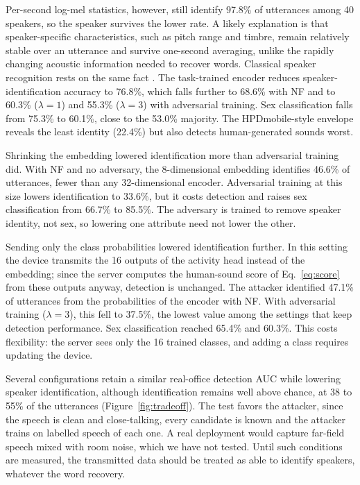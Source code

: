\documentclass[11pt]{article}
\begin{document}
Per-second log-mel statistics, however, still identify 97.8\% of utterances among 40 speakers, so the speaker survives the lower rate. A likely explanation is that speaker-specific characteristics, such as pitch range and timbre, remain relatively stable over an utterance and survive one-second averaging, unlike the rapidly changing acoustic information needed to recover words. Classical speaker recognition rests on the same fact \citep{reynolds2000gmm}. The task-trained encoder reduces speaker-identification accuracy to 76.8\%, which falls further to 68.6\% with NF and to 60.3\% ($\lambda=1$) and 55.3\% ($\lambda=3$) with adversarial training. Sex classification falls from 75.3\% to 60.1\%, close to the 53.0\% majority. The HPDmobile-style envelope reveals the least identity (22.4\%) but also detects human-generated sounds worst.

Shrinking the embedding lowered identification more than adversarial training did. With NF and no adversary, the 8-dimensional embedding identifies 46.6\% of utterances, fewer than any 32-dimensional encoder. Adversarial training at this size lowers identification to 33.6\%, but it costs detection and raises sex classification from 66.7\% to 85.5\%. The adversary is trained to remove speaker identity, not sex, so lowering one attribute need not lower the other.

Sending only the class probabilities lowered identification further. In this setting the device transmits the 16 outputs of the activity head instead of the embedding; since the server computes the human-sound score of Eq.~\eqref{eq:score} from these outputs anyway, detection is unchanged. The attacker identified 47.1\% of utterances from the probabilities of the encoder with NF. With adversarial training ($\lambda=3$), this fell to 37.5\%, the lowest value among the settings that keep detection performance. Sex classification reached 65.4\% and 60.3\%. This costs flexibility: the server sees only the 16 trained classes, and adding a class requires updating the device.

Several configurations retain a similar real-office detection AUC while lowering speaker identification, although identification remains well above chance, at 38 to 55\% of the utterances (Figure~\ref{fig:tradeoff}). The test favors the attacker, since the speech is clean and close-talking, every candidate is known and the attacker trains on labelled speech of each one. A real deployment would capture far-field speech mixed with room noise, which we have not tested. Until such conditions are measured, the transmitted data should be treated as able to identify speakers, whatever the word recovery.
\end{document}
